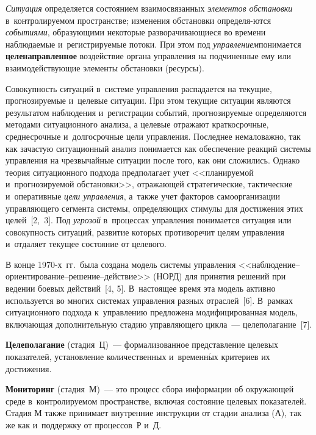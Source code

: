 \begin{multicols}{2}
    \textit{Ситуация} определяется состоянием взаимосвязанных 
\textit{элементов обстановки} в~контролируемом пространстве; изменения 
обстановки определя-\linebreak ются \textit{событиями}, образующими некоторые 
разворачивающиеся во времени наблюдаемые и~ре\-гист\-ри\-ру\-емые потоки. При 
этом под \textit{управлением}\linebreak понимается \textbf{целенаправленное} 
воздействие органа управления на подчиненные ему или взаимодействующие 
элементы обстановки (ресурсы). 
    
    Совокупность ситуаций в~сис\-те\-ме управ\-ле\-ния распадается на текущие, 
прогнозируемые и~целевые ситуации. При этом текущие ситуации являются 
результатом наблюдения и~регистрации событий, прогнозируемые 
определяются методами ситуационного анализа, а целевые отражают 
краткосрочные, среднесрочные и~долгосрочные цели управления. Последнее 
немаловажно, так как зачастую ситуационный анализ понимается как 
обеспечение реакций сис\-те\-мы управ\-ле\-ния на чрезвычайные ситуации после 
того, как они сложились. Однако теория ситуационного подхода 
предполагает учет <<планируемой и~прогнозируемой обстановки>>, 
отражающей стратегические, тактические и~оперативные \textit{цели 
управления}, а~также учет факторов самоорганизации управляющего 
сегмента сис\-те\-мы, определяющих стимулы для достижения этих 
целей~[2,~3]. Под \textit{угрозой} в~процессах управления понимается 
ситуация или совокупность ситуаций, развитие которых противоречит целям 
управления и~отдаляет текущее состояние от целевого.
    
    В конце 1970-х~гг.\ была создана модель сис\-те\-мы управ\-ле\-ния  
<<наблю\-де\-ние--ори\-ен\-ти\-ро\-ва\-ние--ре\-ше\-ние--дей\-ст\-вие>> 
(НОРД) для принятия решений при ведении боевых действий~[4, 5]. 
В~настоящее время эта модель активно используется во многих сис\-те\-мах 
управ\-ле\-ния разных отраслей~[6]. В~рамках ситуационного подхода 
к~управлению предложена модифицированная модель, включающая 
дополнительную стадию управляющего цикла~--- целеполагание~[7].
    
    \textbf{Целеполагание} (стадия~Ц)~--- формализованное представление 
целевых показателей, установление количественных 
и~временн$\acute{\mbox{ы}}$х критериев их достижения.
    
    \textbf{Мониторинг} (стадия~М)~--- это процесс сбора информации об 
окружающей среде в~контролируемом пространстве, включая состояние 
целевых показателей. Стадия М также принимает внутренние инструкции от 
стадии анализа (А), так же как и~поддержку от процессов~Р и~Д. 
    

\end{multicols}
